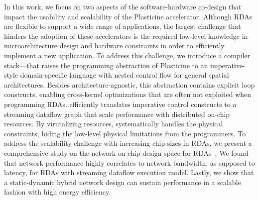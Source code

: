 In this work, we focus on two aspects of the software-hardware co-design that impact the usability
and scalability of the Plasticine accelerator. 
Although RDAs are flexible to support a wide range of applications, 
the largest challenge that hinders the adoption of these accelerators is 
the required low-level knowledge in microarchitecture design and hardware constraints in
order to efficiently implement a new application.
To address this challenge, we introduce a compiler stack--\name--that raises the programming abstraction of
Plasticine to an imperative-style domain-specific language with nested control
flow for general spatial architectures.
Besides architecture-agnostic, this abstraction contains explicit loop constructs, enabling
cross-kernel optimizations that are often not exploited when programming RDAs.
\name efficiently translates imperative control constructs to a streaming
dataflow graph that scale performance with distributed on-chip resources.
By virutalizing resources, \name systematically handles the physical constraints, hiding
the low-level physical limitations from the programmers.
To address the scalability challenge with increasing chip sizes in RDAs, 
we present a comprehensive study on the network-on-chip design space for RDAs~\cite{network}.
We found that network performance highly correlates to network bandwidth, as supposed to latency,
for RDAs with streaming dataflow execution model.
Lastly, we show that a static-dynamic hybrid network design can sustain performance in a 
scalable fashion with high energy efficiency.
